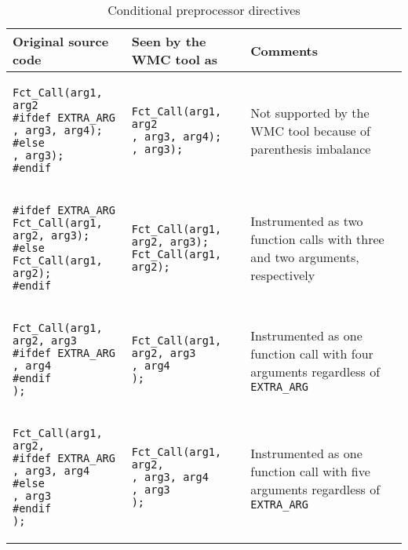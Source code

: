 \begin{table}[ht]
\centering
\caption{Conditional preprocessor directives}
\begin{tabular}{|p{}<{\raggedright}|p{}<{\raggedright}|p{}<{\raggedright}|}
\hline
\textbf{Original source code} & \textbf{Seen by the WMC tool as} & \textbf{Comments} \\
\hline
\begin{BVerbatim}[baseline=t,fontsize=\small]
Fct_Call(arg1, arg2
#ifdef EXTRA_ARG
, arg3, arg4);
#else
, arg3);
#endif

\end{BVerbatim}
&
\begin{BVerbatim}[baseline=t,fontsize=\small]
Fct_Call(arg1, arg2
, arg3, arg4);
, arg3);

\end{BVerbatim}
& Not supported by the WMC tool because of parenthesis imbalance \\
\hline
\begin{BVerbatim}[baseline=t,fontsize=\small]
#ifdef EXTRA_ARG
Fct_Call(arg1, arg2, arg3);
#else
Fct_Call(arg1, arg2);
#endif

\end{BVerbatim}
&
\begin{BVerbatim}[baseline=t,fontsize=\small]
Fct_Call(arg1, arg2, arg3);
Fct_Call(arg1, arg2);

\end{BVerbatim}
& Instrumented as two function calls with three and two arguments, respectively \\
\hline
\begin{BVerbatim}[baseline=t,fontsize=\small]
Fct_Call(arg1, arg2, arg3
#ifdef EXTRA_ARG
, arg4
#endif
);

\end{BVerbatim}
&
\begin{BVerbatim}[baseline=t,fontsize=\small]
Fct_Call(arg1, arg2, arg3
, arg4
);

\end{BVerbatim}
& Instrumented as one function call with four arguments regardless of \verb|EXTRA_ARG| \\
\hline
\begin{BVerbatim}[baseline=t,fontsize=\small]
Fct_Call(arg1, arg2,
#ifdef EXTRA_ARG
, arg3, arg4
#else
, arg3
#endif
);

\end{BVerbatim}
&
\begin{BVerbatim}[baseline=t,fontsize=\small]
Fct_Call(arg1, arg2,
, arg3, arg4
, arg3
);

\end{BVerbatim}
& Instrumented as one function call with five arguments regardless of \verb|EXTRA_ARG| \\
\hline
\end{tabular}
\label{tab:conditional_preprocessor_directives}
\end{table}

